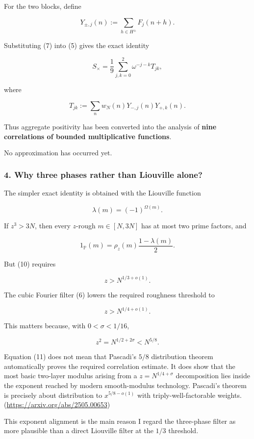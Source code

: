 For the two blocks, define

\[
Y_{\pm,j}(n)
:=
\sum_{h\in H^\pm}F_j(n+h).
\]

Substituting (7) into (5) gives the exact identity

\[
\boxed{
S_\times
=
\frac19
\sum_{j,k=0}^2
\omega^{-j-k}T_{jk},
}
\tag{8}
\]

where

\[
T_{jk}
:=
\sum_n w_N(n)Y_{-,j}(n)Y_{+,k}(n).
\tag{9}
\]

Thus aggregate positivity has been converted into the analysis of \textbf{nine correlations of bounded multiplicative functions}.

No approximation has occurred yet.

\medskip
\medskip


\subsubsection*{4. Why three phases rather than Liouville alone?}

The simpler exact identity is obtained with the Liouville function

\[
\lambda(m)=(-1)^{\Omega(m)}.
\]

If \(z^3>3N\), then every \(z\)-rough \(m\in[N,3N]\) has at most two prime factors, and

\[
1_{\mathbb P}(m)
=
\rho_z(m)\frac{1-\lambda(m)}2.
\tag{10}
\]

But (10) requires

\[
z>N^{1/3+o(1)}.
\]

The cubic Fourier filter (6) lowers the required roughness threshold to

\[
z>N^{1/4+o(1)}.
\]

This matters because, with \(0<\sigma<1/16\),

\[
z^2=N^{1/2+2\sigma}<N^{5/8}.
\tag{11}
\]

Equation (11) does not mean that Pascadi’s \(5/8\) distribution theorem automatically proves the required correlation estimate. It does show that the most basic two-layer modulus arising from a \(z=N^{1/4+\sigma}\) decomposition lies inside the exponent reached by modern smooth-modulus technology. Pascadi’s theorem is precisely about distribution to \(x^{5/8-o(1)}\) with triply-well-factorable weights. (\url{https://arxiv.org/abs/2505.00653})

This exponent alignment is the main reason I regard the three-phase filter as more plausible than a direct Liouville filter at the \(1/3\) threshold.

